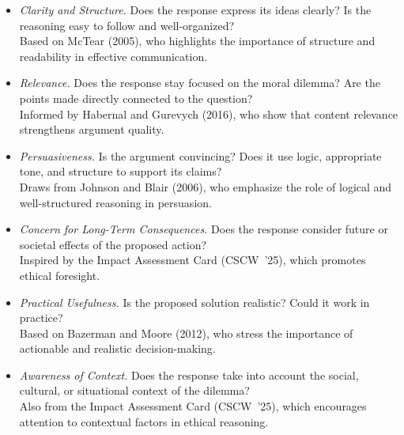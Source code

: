 \documentclass[sigconf, authorversion, nonacm, screen]{acmart}
\begin{document}
\begin{itemize}
  \item \textit{Clarity and Structure.} Does the response express its ideas clearly? Is the reasoning easy to follow and well-organized?\\
  \hspace*{0.5em}Based on McTear (2005), who highlights the importance of structure and readability in effective communication.

  \item \textit{Relevance.} Does the response stay focused on the moral dilemma? Are the points made directly connected to the question?\\
  \hspace*{0.5em}Informed by Habernal and Gurevych (2016), who show that content relevance strengthens argument quality.

  \item \textit{Persuasiveness.} Is the argument convincing? Does it use logic, appropriate tone, and structure to support its claims?\\
  \hspace*{0.5em}Draws from Johnson and Blair (2006), who emphasize the role of logical and well-structured reasoning in persuasion.

  \item \textit{Concern for Long-Term Consequences.} Does the response consider future or societal effects of the proposed action?\\
  \hspace*{0.5em}Inspired by the Impact Assessment Card (CSCW~'25), which promotes ethical foresight.

  \item \textit{Practical Usefulness.} Is the proposed solution realistic? Could it work in practice?\\
  \hspace*{0.5em}Based on Bazerman and Moore (2012), who stress the importance of actionable and realistic decision-making.

  \item \textit{Awareness of Context.} Does the response take into account the social, cultural, or situational context of the dilemma?\\
  \hspace*{0.5em}Also from the Impact Assessment Card (CSCW~'25), which encourages attention to contextual factors in ethical reasoning.
\end{itemize}
\end{document}

